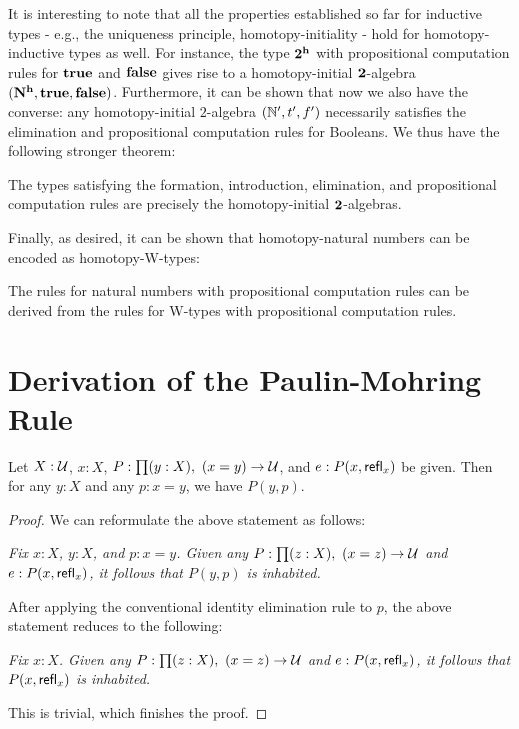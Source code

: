 It is interesting to note that all the properties established so far for inductive types - e.g., the uniqueness principle, homotopy-initiality - hold for homotopy-inductive types as well. For instance, the type $\mathbf{2^h}$ with propositional computation rules for $\mathbf{true}$ and $\mathbf{false}$ gives rise to a homotopy-initial $\mathbf{2}$-algebra $(\mathbf{N^h}, \mathbf{true}, \mathbf{false})$. Furthermore, it can be shown that now we also have the converse: any homotopy-initial $2$-algebra $(\mathbb{N}',t',f')$ necessarily satisfies the elimination and propositional computation rules for Booleans. We thus have the following stronger theorem:

\begin{thm}
The types satisfying the formation, introduction, elimination, and propositional computation rules are precisely the homotopy-initial $\mathbf{2}$-algebras.
\end{thm}

Finally, as desired, it can be shown that homotopy-natural numbers can be encoded as homotopy-W-types:

\begin{thm}
The rules for natural numbers with propositional computation rules can be derived from the rules for W-types with propositional computation rules.
\end{thm}

\section{Derivation of the Paulin-Mohring Rule}
\begin{thm}
Let $X : \mathcal{U}$, $x : X$, $P : \prd{y : X} (x = y) \to \type$, and $e : P(x, \mathsf{refl}_{x})$ be given. Then for any $y : X$ and any $p : x = y$, we have $P(y,p)$.
\end{thm}
\begin{proof}
We can reformulate the above statement as follows: \medskip

\emph{Fix $x : X$, $y : X$, and $p : x = y$. Given any $P : \prd{z : X} (x = z) \to \type$ and $e : P(x, \mathsf{refl}_{x})$, it follows that $P(y,p)$ is inhabited.}
\medskip

After applying the conventional identity elimination rule to $p$, the above statement reduces to the following:

\medskip

\emph{Fix $x : X$. Given any $P : \prd{z : X} (x = z) \to \type$ and $e : P(x, \mathsf{refl}_{x})$, it follows that $P(x,\mathsf{refl}_{x})$ is inhabited.}

\medskip
This is trivial, which finishes the proof.
\end{proof}

